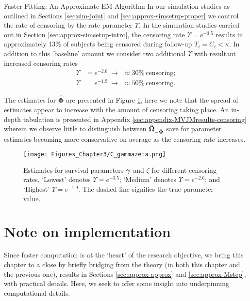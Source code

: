 \begin{chapter}{\label{cha:approx}Faster Fitting: An Approximate EM Algorithm}
  In our simulation studies as outlined in Sections \ref{sec:sim-joint} and \ref{sec:approx-simsetup-proper} we control the rate of censoring by the rate parameter $\Upsilon$. In the simulation studies carried out in Section \ref{sec:approx-simsetup-intro}, the censoring rate $\Upsilon=e^{-3.5}$ results in approximately 13\% of subjects being censored during follow-up \ie $T_i=C_i<\kappa$. In addition to this `baseline' amount we consider two additional $\Upsilon$ with resultant increased censoring rates
  \begin{align*}
      \Upsilon &= e^{-2.6}\ \longrightarrow\ \ \approx\mathrm{30\%\ censoring};\\
      \Upsilon &= e^{-1.9}\ \longrightarrow\ \ \approx\mathrm{50\%\ censoring}.
  \end{align*}

  The estimates for $\hat{\bm{\Phi}}$ are presented in Figure \ref{fig:approx-sens-C}, here we note that the spread of estimates appear to increase with the amount of censoring taking place. An in-depth tabulation is presented in Appendix \ref{sec:appendix-MVJMresults-censoring} wherein we observe little to distinguish between $\hat{\bm{\Omega}}_{-\hat{\bm{\Phi}}}$ save for parameter estimates becoming more conservative on average as the censoring rate increases. 

  \begin{figure}[ht]
      \centering
      \texttt{[image: Figures\_Chapter3/C\_gammazeta.png]}
      \caption{Estimates for survival parameters $\bm{\gamma}$ and $\zeta$ for different censoring rates. `Lowest' denotes $\Upsilon=e^{-3.5}$; `Medium' denotes $\Upsilon=e^{-2.6}$; and `Highest' $\Upsilon=e^{-1.9}$. The dashed line signifies the true parameter value.}
      \label{fig:approx-sens-C}
  \end{figure}

  \section{Note on implementation}\label{sec:approx-implementation}
  Since faster computation is at the `heart' of the research objective, we bring this chapter to a close by briefly bridging from the theory (in both this chapter and the previous one), results in Sections \ref{sec:approx-approx} and \ref{sec:approx-Mstep}, with practical details. Here, we seek to offer some insight into underpinning computational details.


\end{chapter}
